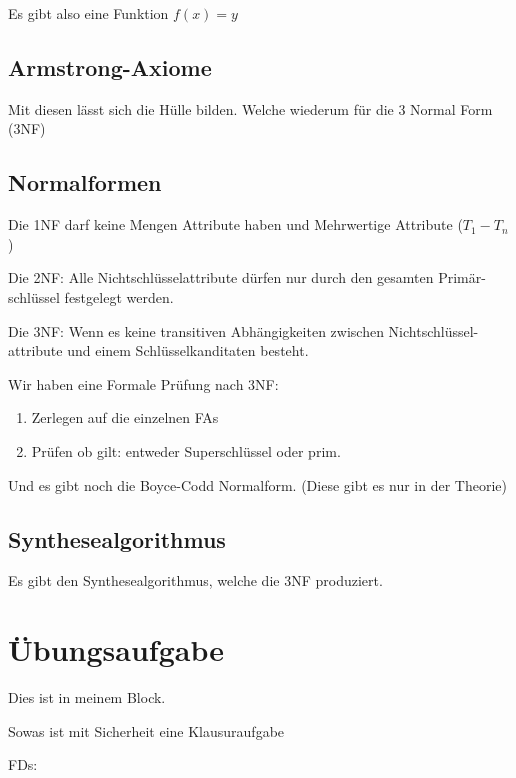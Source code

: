 \documentclass[a4paper]{article}
\begin{document}
Es gibt also eine Funktion $f(x) = y$

\subsection{Armstrong-Axiome}

Mit diesen lässt sich die Hülle bilden. Welche wiederum für die 3 Normal Form (3NF)

\subsection{Normalformen}

Die 1NF darf keine Mengen Attribute haben und Mehrwertige Attribute ($T_1-T_n$)

Die 2NF: Alle Nichtschlüsselattribute dürfen nur durch den gesamten Primär-schlüssel festgelegt werden.

Die 3NF: Wenn es keine transitiven Abhängigkeiten zwischen Nichtschlüssel-attribute und einem Schlüsselkanditaten besteht.

Wir haben eine Formale Prüfung nach 3NF:

\begin{enumerate}
    \item Zerlegen auf die einzelnen FAs
    \item Prüfen ob gilt: entweder Superschlüssel oder prim.
\end{enumerate}

Und es gibt noch die Boyce-Codd Normalform. (Diese gibt es nur in der Theorie)


\subsection{Synthesealgorithmus}

Es gibt den Synthesealgorithmus, welche die 3NF produziert.

\section{Übungsaufgabe}

Dies ist in meinem Block.


Sowas ist mit Sicherheit eine Klausuraufgabe

FDs:
\end{document}

